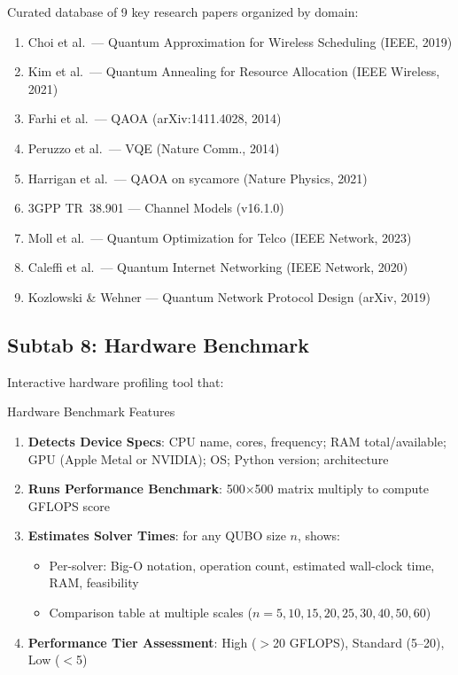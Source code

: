 \documentclass[11pt,a4paper]{article}
\begin{document}
Curated database of 9 key research papers organized by domain:

\begin{enumerate}
  \item Choi et al.\ — Quantum Approximation for Wireless Scheduling (IEEE, 2019)
  \item Kim et al.\ — Quantum Annealing for Resource Allocation (IEEE Wireless, 2021)
  \item Farhi et al.\ — QAOA (arXiv:1411.4028, 2014)
  \item Peruzzo et al.\ — VQE (Nature Comm., 2014)
  \item Harrigan et al.\ — QAOA on sycamore (Nature Physics, 2021)
  \item 3GPP TR~38.901 — Channel Models (v16.1.0)
  \item Moll et al.\ — Quantum Optimization for Telco (IEEE Network, 2023)
  \item Caleffi et al.\ — Quantum Internet Networking (IEEE Network, 2020)
  \item Kozlowski \& Wehner — Quantum Network Protocol Design (arXiv, 2019)
\end{enumerate}

\subsection{Subtab 8: Hardware Benchmark}

Interactive hardware profiling tool that:

\begin{featurebox}{Hardware Benchmark Features}
\begin{enumerate}
  \item \textbf{Detects Device Specs}: CPU name, cores, frequency; RAM total/available; GPU (Apple Metal or NVIDIA); OS; Python version; architecture
  \item \textbf{Runs Performance Benchmark}: 500$\times$500 matrix multiply to compute GFLOPS score
  \item \textbf{Estimates Solver Times}: for any QUBO size $n$, shows:
    \begin{itemize}
      \item Per-solver: Big-O notation, operation count, estimated wall-clock time, RAM, feasibility
      \item Comparison table at multiple scales ($n = 5, 10, 15, 20, 25, 30, 40, 50, 60$)
    \end{itemize}
  \item \textbf{Performance Tier Assessment}: High ($>$20 GFLOPS), Standard (5--20), Low ($<$5)
\end{enumerate}
\end{featurebox}
\end{document}

